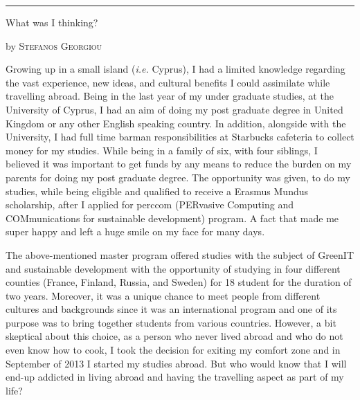 \documentclass[10pt,a4paper]{article} %
\newcommand{\SepRule}{\noindent	%
\begin{center}
\rule{250pt}{1pt} %
\end{center}
}
\newcommand{\NewsItem}[1]{ %
\usefont{T1}{fvs}{n}{n} %
\vspace{24pt}\large #1\vspace{3pt} %
\par \normalsize \normalfont}
\newcommand{\NewsAuthor}[1]{ %
\hfill by \textsc{#1} \vspace{20pt} %
\par \normalfont}
\begin{document}
\vspace{0.5cm}
\SepRule %
\vspace{0.5cm}

\begin{multicols}{3} %


\NewsItem{What was I thinking?}
\NewsAuthor{Stefanos Georgiou}

Growing up in a small island (\textit{i.e.} Cyprus), I had a limited knowledge regarding 
the vast experience, new ideas, and cultural benefits I could assimilate while 
travelling abroad. 
Being in the last year of my under graduate studies, at the University of Cyprus, 
I had an aim of doing my post graduate degree in United Kingdom or any other 
English speaking country. 
In addition, alongside with the University, I had full time barman responsibilities 
at Starbucks cafeteria to collect money for my studies. 
While being in a family of six, with four siblings, I believed it was important 
to get funds by any means to reduce the burden on my parents for doing my post graduate 
degree. 
The opportunity was given, to do my studies, while being eligible and qualified to 
receive a Erasmus Mundus scholarship, after I applied for {\sc perccom} (PERvasive 
Computing and COMmunications for sustainable development) program. 
A fact that made me super happy and left a huge smile on my face for many days.


The above-mentioned master program offered studies with the subject of GreenIT and 
sustainable development with the opportunity of studying in four different counties 
(France, Finland, Russia, and Sweden) for 18 student for the duration of two years. 
Moreover, it was a unique chance to meet people from different cultures and backgrounds 
since it was an international program and one of its purpose was to bring together 
students from various countries. 
However, a bit skeptical about this choice, as a person who never lived abroad and 
who do not even know how to cook, I took the decision for exiting my comfort zone 
and in September of 2013 I started my studies abroad. 
But who would know that I will end-up addicted in living abroad and having the 
travelling aspect as part of my life?



\end{multicols}
\end{document}
